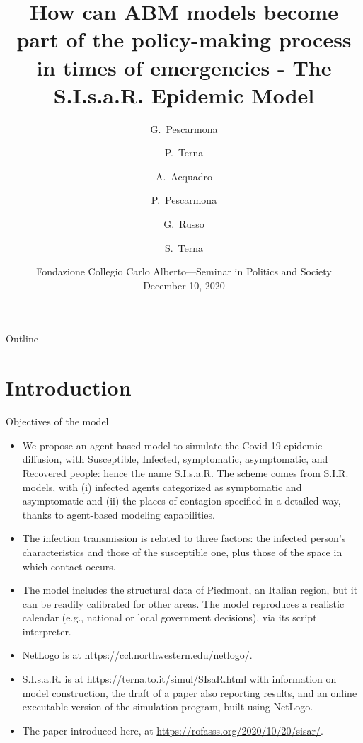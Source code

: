 \documentclass[8pt]{beamer}
\title[S.I.s.a.R. Epidemic Model] %
{How can ABM models become part of the policy-making process in times of emergencies - The S.I.s.a.R. Epidemic Model}
\author[] %
{G.~Pescarmona\inst{1} \and P.~Terna\inst{2} \and A.~Acquadro\inst{1} \and P.~Pescarmona\inst{3} \and G.~Russo\inst{4}  
\and S.~Terna\inst{5}  }
\institute[] %
{
  \inst{1}%
 University of Torino, Italy
  \and
  \inst{2}%
  University of Torino, Italy, retired \& Fondazione Collegio Carlo Alberto, Honorary Fellow, Italy
 \and
  \inst{3}%
  University of Groningen, The Netherlands  
  \and
  \inst{4}%
  Centro Einaudi, Torino, Italy
  \and
  \inst{5}%
 tomorrowdata.io
  }
\date[] %
{Fondazione Collegio Carlo Alberto---Seminar in Politics and Society\\December 10, 2020}
\begin{document}
\begin{frame}
  \titlepage
\end{frame}

\begin{frame}{Outline}
  \tableofcontents
\end{frame}

\section{Introduction}

\begin{frame}{Objectives of the model}

  \begin{itemize}
  \item
We propose an agent-based model to simulate the Covid-19 epidemic diffusion, with Susceptible, Infected, symptomatic, asymptomatic, and Recovered people: hence the name S.I.s.a.R. The scheme comes from S.I.R. models, with (i) infected agents categorized as symptomatic and asymptomatic and (ii) the places of contagion specified in a detailed way, thanks to agent-based modeling capabilities. 

 \item
The infection transmission is related to three factors: the infected person's characteristics and those of the susceptible one, plus those of the space in which contact occurs.

 \item
The model includes the structural data of Piedmont, an Italian region, but it can be readily calibrated for other areas. The model reproduces a realistic calendar (e.g., national or local government decisions), via its script interpreter.  

\item NetLogo is at \url{https://ccl.northwestern.edu/netlogo/}.

 \item
 
S.I.s.a.R. is at \url{https://terna.to.it/simul/SIsaR.html} with information on model construction, the draft of a paper also reporting results, and an online executable version of the simulation program, built using NetLogo.

 \item
 The paper introduced here, at \url{https://rofasss.org/2020/10/20/sisar/}.

 \end{itemize}
\end{frame}
\end{document}

